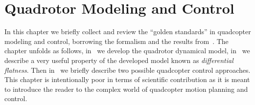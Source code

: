 \chapter{Quadrotor Modeling and Control}%
\label{CH:MODELING-AND-CONTROL}

In this chapter we briefly collect and review the ``golden standards'' in quadcopter modeling and control, borrowing the formalism and the
results from~\cite{tal2020accurate, faessler2017differential, kai2017nonlinear, mellinger2011minimum, richter2016polynomial, sun2022comparative, falanga2018pampc}.
The chapter unfolds as follows, in~ we develop the quadrotor dynamical model, in~
we describe a very useful property of the developed model known as \emph{differential flatness}.
Then in~ %
we briefly describe two possible quadcopter control approaches.
This chapter is intentionally poor in terms of scientific contribution as it is meant to introduce the reader to the complex world
of quadcopter motion planning and control.

